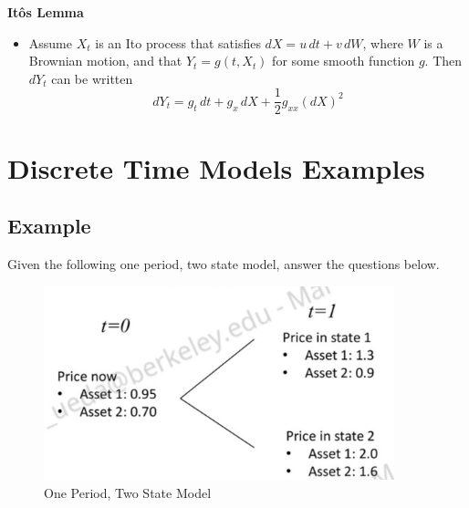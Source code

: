 \documentclass[11pt]{article}
\begin{document}
\textbf{It\^{o}s Lemma}
\begin{itemize}
    \item Assume $X_t$ is an Ito process that satisfies $dX = u \, dt + v \,dW$, where $W$ is 
    a Brownian motion, and that $Y_t = g(t, X_t)$ for some smooth function $g$. Then $dY_t$ 
    can be written 
    \[dY_t = g_t \,dt + g_x \,dX + \frac{1}{2} g_{xx} {(dX)}^2\]
\end{itemize}

\section{Discrete Time Models Examples}
\subsection{Example}
Given the following one period, two state model, answer the questions below. 
\begin{figure}[H] 
    \centering 
    \includegraphics[width=4in]{imgs/example1.png}
    \caption{One Period, Two State Model}
\end{figure}
\end{document}
